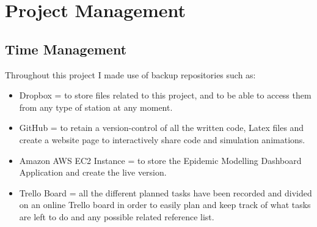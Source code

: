 \chapter{Project Management}

\label{ch:management}
\setlength\lineskip{0pt}
\vspace*{15pt}

\section{Time Management}
Throughout this project I made use of backup repositories such as:

\begin{itemize}
\itemsep0em
\item Dropbox = to store files related to this project, and to be able to access them from any type of station at any moment.
\item GitHub = to retain a version-control of all the written code, Latex files and create a website page to interactively share code and simulation animations.
\item Amazon AWS EC2 Instance = to store the Epidemic Modelling Dashboard Application and create the live version.
\item Trello Board = all the different planned tasks have been recorded and divided on an online Trello board in order to easily plan and keep track of what tasks are left to do and any possible related reference list.
\end{itemize}



